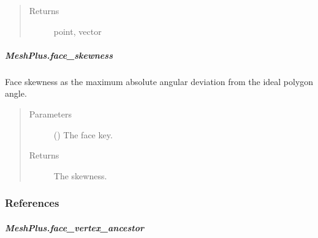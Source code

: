 \documentclass[letterpaper,10pt,english]{sphinxmanual}
\begin{document}
\begin{fulllineitems}
\begin{fulllineitems}
\begin{quote}
\begin{description}
\item[{Returns}] \leavevmode
{} \textendash{} point, vector

\end{description}\end{quote}

\end{fulllineitems}



\subparagraph{MeshPlus.face\_skewness}
\label{\detokenize{api/generated/directional_clustering.mesh.MeshPlus.face_skewness:meshplus-face-skewness}}\label{\detokenize{api/generated/directional_clustering.mesh.MeshPlus.face_skewness::doc}}

\begin{fulllineitems}
\label{\detokenize{api/generated/directional_clustering.mesh.MeshPlus.face_skewness:directional_clustering.mesh.MeshPlus.face_skewness}}
Face skewness as the maximum absolute angular deviation from the ideal polygon angle.
\begin{quote}\begin{description}
\item[{Parameters}] \leavevmode
{} () \textendash{} The face key.

\item[{Returns}] \leavevmode
{} \textendash{} The skewness.

\end{description}\end{quote}
\subsubsection*{References}

\end{fulllineitems}



\subparagraph{MeshPlus.face\_vertex\_ancestor}
\label{\detokenize{api/generated/directional_clustering.mesh.MeshPlus.face_vertex_ancestor:meshplus-face-vertex-ancestor}}\label{\detokenize{api/generated/directional_clustering.mesh.MeshPlus.face_vertex_ancestor::doc}}


\end{fulllineitems}
\end{document}
